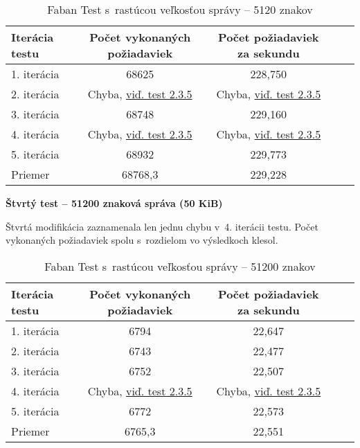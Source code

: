 \documentclass[12pt,oneside,final]{fithesis-utf8}
\begin{document}
\begin{itemize}
\begin{table}[H]
\begin{center}
\begin{tabular}{ | l | c | c | c | c |}
		\hline
		 \textbf{Iterácia testu} & \textbf{Počet vykonaných požiadaviek} & \textbf{Počet požiadaviek za sekundu} \\ \hline
		 1. iterácia & 68625 & 228,750 \\ \hline
		 2. iterácia & Chyba, \hyperlink{label}{viď. test 2.3.5} & Chyba, \hyperlink{label}{viď. test 2.3.5} \\ \hline
		 3. iterácia & 68748 & 229,160 \\ \hline
		 4. iterácia & Chyba, \hyperlink{label}{viď. test 2.3.5} & Chyba, \hyperlink{label}{viď. test 2.3.5} \\ \hline
		 5. iterácia & 68932 & 229,773 \\ \hline
		 Priemer & 68768,3 & 229,228 \\ \hline
		 
\end{tabular}
\end{center}
\caption{Faban Test s~rastúcou veľkosťou správy -- 5120 znakov}
\end{table}


\textbf{Štvrtý test -- 51200 znaková správa (50 KiB)}

Štvrtá modifikácia zaznamenala len jednu chybu v~4. iterácii testu. Počet vykonaných požiadaviek spolu s~rozdielom vo výsledkoch klesol.

\begin{table}[H]
\begin{center}
\begin{tabular}{ | l | c | c | c | c |}
		\hline
		 \textbf{Iterácia testu} & \textbf{Počet vykonaných požiadaviek} & \textbf{Počet požiadaviek za sekundu} \\ \hline
		 1. iterácia & 6794 & 22,647 \\ \hline
		 2. iterácia & 6743 & 22,477 \\ \hline
		 3. iterácia & 6752 & 22,507 \\ \hline
		 4. iterácia & Chyba, \hyperlink{label}{viď. test 2.3.5} & Chyba, \hyperlink{label}{viď. test 2.3.5} \\ \hline
		 5. iterácia & 6772 & 22,573 \\ \hline
		 Priemer & 6765,3 & 22,551 \\ \hline
		 
\end{tabular}
\end{center}
\caption{Faban Test s~rastúcou veľkosťou správy -- 51200 znakov}
\end{table}



\end{itemize}
\end{document}
